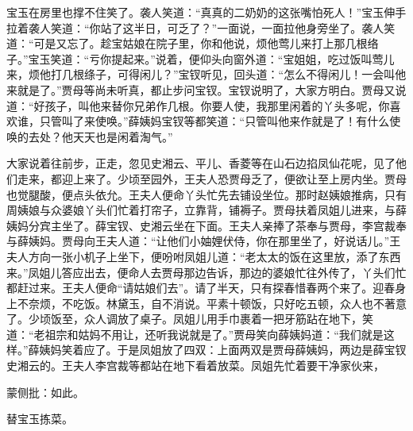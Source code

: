 \begin{parag}
    宝玉在房里也撑不住笑了。袭人笑道：“真真的二奶奶的这张嘴怕死人！”宝玉伸手拉着袭人笑道：“你站了这半日，可乏了？”一面说，一面拉他身旁坐了。袭人笑道：“可是又忘了。趁宝姑娘在院子里，你和他说，烦他莺儿来打上那几根络子。”宝玉笑道：“亏你提起来。”说着，便仰头向窗外道：“宝姐姐，吃过饭叫莺儿来，烦他打几根绦子，可得闲儿？”宝钗听见，回头道：“怎么不得闲儿！一会叫他来就是了。”贾母等尚未听真，都止步问宝钗。宝钗说明了，大家方明白。贾母又说道：“好孩子，叫他来替你兄弟作几根。你要人使，我那里闲着的丫头多呢，你喜欢谁，只管叫了来使唤。”薛姨妈宝钗等都笑道：“只管叫他来作就是了！有什么使唤的去处？他天天也是闲着淘气。”
\end{parag}


\begin{parag}
    大家说着往前步，正走，忽见史湘云、平儿、香菱等在山石边掐凤仙花呢，见了他们走来，都迎上来了。少顷至园外，王夫人恐贾母乏了，便欲让至上房内坐。贾母也觉腿酸，便点头依允。王夫人便命丫头忙先去铺设坐位。那时赵姨娘推病，只有周姨娘与众婆娘丫头们忙着打帘子，立靠背，铺褥子。贾母扶着凤姐儿进来，与薛姨妈分宾主坐了。薛宝钗、史湘云坐在下面。王夫人亲捧了茶奉与贾母，李宫裁奉与薛姨妈。贾母向王夫人道：“让他们小妯娌伏侍，你在那里坐了，好说话儿。”王夫人方向一张小机子上坐下，便吩咐凤姐儿道：“老太太的饭在这里放，添了东西来。”凤姐儿答应出去，便命人去贾母那边告诉，那边的婆娘忙往外传了，丫头们忙都赶过来。王夫人便命“请姑娘们去”。请了半天，只有探春惜春两个来了。迎春身上不奈烦，不吃饭。林黛玉，自不消说。平素十顿饭，只好吃五顿，众人也不著意了。少顷饭至，众人调放了桌子。凤姐儿用手巾裹着一把牙筋跕在地下，笑道：“老祖宗和姑妈不用让，还听我说就是了。”贾母笑向薛姨妈道：“我们就是这样。”薛姨妈笑着应了。于是凤姐放了四双：上面两双是贾母薛姨妈，两边是薛宝钗史湘云的。王夫人李宫裁等都站在地下看着放菜。凤姐先忙着要干净家伙来，\begin{note}蒙侧批：如此。\end{note}替宝玉拣菜。
\end{parag}


